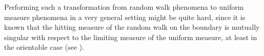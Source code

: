 Performing such a transformation from random walk phenomena to uniform measure phenomena in a very general setting might be quite hard, since it is known that the hitting measure of the random walk on the boundary is mutually singular with respect to the limiting measure of the uniform measure, at least in the orientable case (see \textcite{gadre2015word}).



